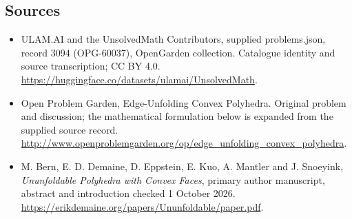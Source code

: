 \documentclass[11pt,a4paper]{article}
\begin{document}
\subsection{Sources}
\begin{itemize}
\item[S1] ULAM.AI and the UnsolvedMath Contributors, supplied problems.json, record 3094 (OPG-60037), OpenGarden collection. Catalogue identity and source transcription; CC BY 4.0.
\url{https://huggingface.co/datasets/ulamai/UnsolvedMath}.
\item[S2] Open Problem Garden, Edge-Unfolding Convex Polyhedra. Original problem and discussion; the mathematical formulation below is expanded from the supplied source record.
\url{http://www.openproblemgarden.org/op/edge_unfolding_convex_polyhedra}.
\item[A1] M. Bern, E. D. Demaine, D. Eppstein, E. Kuo, A. Mantler and J. Snoeyink, \emph{Ununfoldable Polyhedra with Convex Faces}, primary author manuscript, abstract and introduction checked 1 October 2026. \url{https://erikdemaine.org/papers/Ununfoldable/paper.pdf}.
\end{itemize}
\end{document}
